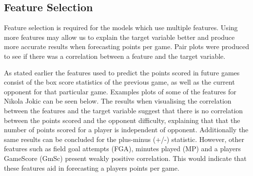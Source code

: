 \documentclass[a4paper,11pt,twoside]{article}
\begin{document}
\subsection{Feature Selection}

Feature selection is required for the models which use multiple features. Using more features may allow us to explain the target variable better and produce more accurate results when forecasting points per game.  Pair plots were produced to see if there was a correlation between a feature and the target variable. 

As stated earlier the features used to predict the points scored in future games consist of the box score statistics of the previous game, as well as the current opponent for that particular game. Examples plots of some of the features for Nikola Jokic can be seen below. The results when visualising the correlation between the features and the target variable suggest that there is no correlation between the points scored and the opponent difficulty, explaining that that the number of points scored for a player is independent of opponent. Additionally the same results can be concluded for the plus-minus (+/-) statistic. However, other features such as field goal attempts (FGA), minutes played (MP) and a players GameScore (GmSc) present weakly positive correlation. This would indicate that these features aid in forecasting a players points per game. 
\end{document}
